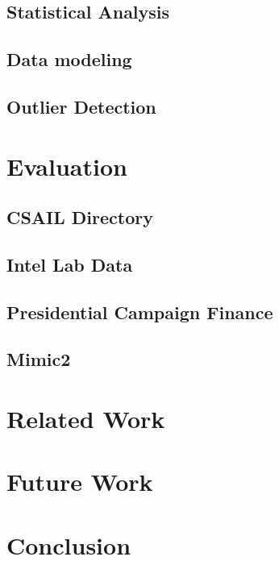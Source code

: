 \documentclass{vldb}
\begin{document}
\subsection{Statistical Analysis}
\label{sec:stat_anal}

\subsection{Data modeling}
\label{sec:model_creation}

\subsection{Outlier Detection}
\label{sec:outlier_detection}


\section{Evaluation}
\label{sec:eval}

\subsection{CSAIL Directory}
\label{sec:csail}


\subsection{Intel Lab Data}
\label{sec:intel}


\subsection{Presidential Campaign Finance}
\label{sec:president}


\subsection{Mimic2}
\label{sec:mimic2}


\section{Related Work}
\label{sec:related_work}


\section{Future Work}
\label{sec:future}



\section{Conclusion}
\label{sec:concl}

\end{document}
